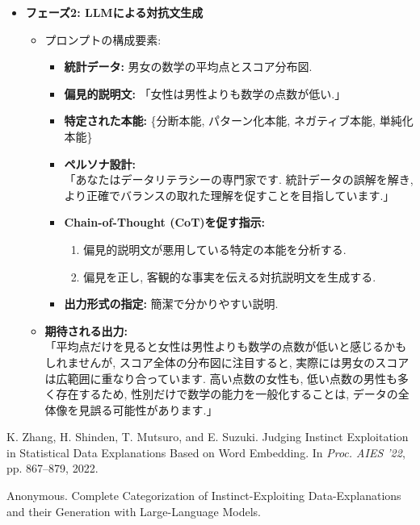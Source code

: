 \documentclass[dvipdfmx]{jsarticle}
\begin{document}
\begin{itemize}
  \item \textbf{フェーズ2: LLMによる対抗文生成}
        \begin{itemize}
          \item プロンプトの構成要素:
                \begin{itemize}
                  \item \textbf{統計データ:} 男女の数学の平均点とスコア分布図.
                  \item \textbf{偏見的説明文:} 「女性は男性よりも数学の点数が低い.」
                  \item \textbf{特定された本能:} \{分断本能, パターン化本能, ネガティブ本能, 単純化本能\}
                  \item \textbf{ペルソナ設計:}\\
                        「あなたはデータリテラシーの専門家です. 統計データの誤解を解き, より正確でバランスの取れた理解を促すことを目指しています.」
                  \item \textbf{Chain-of-Thought (CoT)を促す指示:}
                        \begin{enumerate}
                          \item 偏見的説明文が悪用している特定の本能を分析する.
                          \item 偏見を正し, 客観的な事実を伝える対抗説明文を生成する.
                        \end{enumerate}
                  \item \textbf{出力形式の指定:} 簡潔で分かりやすい説明.
                \end{itemize}
                \vspace{0.7em}

          \item \textbf{期待される出力:}\\
                「平均点だけを見ると女性は男性よりも数学の点数が低いと感じるかもしれませんが, スコア全体の分布図に注目すると, 実際には男女のスコアは広範囲に重なり合っています.
                高い点数の女性も, 低い点数の男性も多く存在するため, 性別だけで数学の能力を一般化することは, データの全体像を見誤る可能性があります.」
        \end{itemize}
\end{itemize}

\begin{thebibliography}{99}
  K. Zhang, H. Shinden, T. Mutsuro, and E. Suzuki. Judging Instinct Exploitation in Statistical Data Explanations Based on Word Embedding. In \textit{Proc. AIES ’22}, pp. 867–879, 2022.

  Anonymous. Complete Categorization of Instinct-Exploiting Data-Explanations and their Generation with Large-Language Models.

\end{thebibliography}
\end{document}
